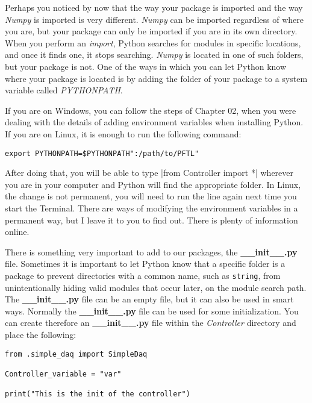 Perhaps you noticed by now that the way your package is imported and the
way \emph{Numpy} is imported is very different. \emph{Numpy} can be
imported regardless of where you are, but your package can only be
imported if you are in its own directory. When you perform an
\emph{import}, Python searches for modules in specific locations, and
once it finds one, it stops searching. \emph{Numpy} is located in one of
such folders, but your package is not. One of the ways in which you can
let Python know where your package is located is by adding the folder of
your package to a system variable called \emph{PYTHONPATH}.

If you are on Windows, you can follow the steps of Chapter 02, when you
were dealing with the details of adding environment variables when
installing Python. If you are on Linux, it is enough to run the
following command:

\begin{verbatim}
export PYTHONPATH=$PYTHONPATH":/path/to/PFTL"
\end{verbatim}

After doing that, you will be able to type
|from Controller import *| wherever you are in your computer
and Python will find the appropriate folder. In Linux, the change is not
permanent, you will need to run the line again next time you start the
Terminal. There are ways of modifying the environment variables in a
permanent way, but I leave it to you to find out. There is plenty of
information online.

There is something very important to add to our packages, the
\textbf{\_\_init\_\_.py} file. Sometimes it is important to let Python
know that a specific folder is a package to prevent directories with a
common name, such as \texttt{string}, from unintentionally hiding valid
modules that occur later, on the module search path. The
\textbf{\_\_init\_\_.py} file can be an empty file, but it can also be
used in smart ways. Normally the \textbf{\_\_init\_\_.py} file can be
used for some initialization. You can create therefore an
\textbf{\_\_init\_\_.py} file within the \emph{Controller} directory and
place the following:

\begin{verbatim}
from .simple_daq import SimpleDaq

Controller_variable = "var"

print("This is the init of the controller")
\end{verbatim}

